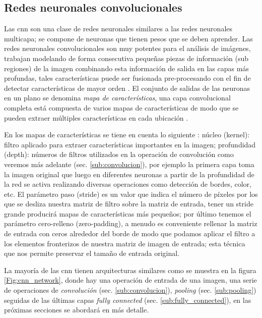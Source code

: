 \subsection{Redes neuronales convolucionales}\label{sub:cnn}

Las \ac{cnn} son una clase de redes neuronales  similares a las redes neuronales multicapa; se compone de neuronas que tienen pesos que se deben aprender. Las redes neuronales convolucionales son muy potentes para el análisis de imágenes, trabajan modelando de forma consecutiva pequeñas piezas de información (sub regiones) de la imagen combinando esta información de salida en las capas más profundas, tales características puede ser fusionada pre-procesando con el fin de detectar características de mayor orden \citep{murphy}. El conjunto de salidas de las neuronas en un plano se denomina \textit{mapa de características}, una capa convolucional completa está compuesta de varios mapas de características de modo que se pueden extraer múltiples características en cada ubicación \citep{cnns}.

En los mapas de características se tiene en cuenta lo siguiente \citep{cnnsarticle}: núcleo (kernel): filtro aplicado para extraer características importantes en la imagen; profundidad (depth): números de filtros utilizados en la operación de convolución como veremos más adelante (sec. \ref{sub:convolucion}), por ejemplo la primera capa toma la imagen original que luego en  diferentes neuronas a partir de la profundidad de la red se activa realizando diversas operaciones como detección de bordes, color, etc. El parámetro paso  (stride) es un valor que indica el número de píxeles por los que se desliza nuestra matriz de filtro sobre la matriz de entrada, tener un stride grande producirá mapas de características más pequeños; por último tenemos el parámetro cero-relleno (zero-padding), a menudo es conveniente rellenar la matriz de entrada con ceros alrededor del borde de modo que podamos aplicar el filtro a los elementos fronterizos de nuestra matriz de imagen de entrada; esta técnica que nos permite preservar el tamaño de entrada original.

La mayoría de las \ac{cnn} tienen arquitecturas similares como se muestra en la figura \ref{Fig:cnn_network}, donde hay una operación de entrada de una imagen, una serie de operaciones de  \textit{convolución} (sec. \ref{sub:convolucion}),  \textit{pooling} (sec. \ref{sub:pooling}) seguidas de las últimas capas \textit{fully connected} (sec. \ref{sub:fully_connected}), en las próximas secciones se abordará en más detalle. 


